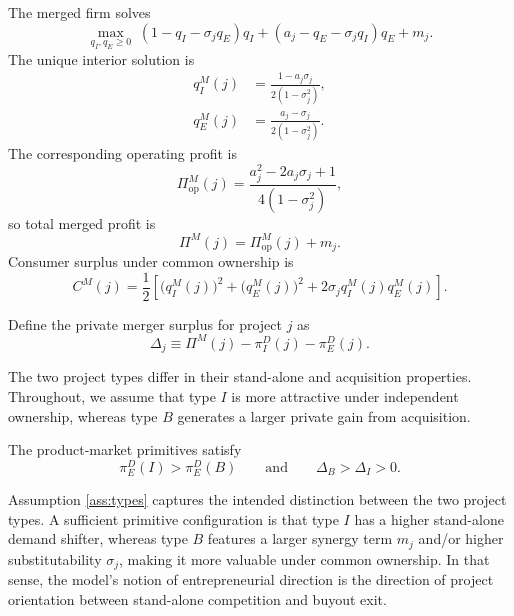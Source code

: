 The merged firm solves
\begin{equation}
    \max_{q_I,q_E \ge 0}\;
    (1-q_I-\sigma_j q_E)q_I
    +
    (a_j-q_E-\sigma_j q_I)q_E
    +
    m_j.
\end{equation}
The unique interior solution is
\begin{align}
    q_I^M(j) &= \frac{1-a_j\sigma_j}{2(1-\sigma_j^2)}, \\
    q_E^M(j) &= \frac{a_j-\sigma_j}{2(1-\sigma_j^2)}.
\end{align}
The corresponding operating profit is
\begin{equation}
    \Pi_{\mathrm{op}}^M(j)
    =
    \frac{a_j^2 - 2a_j\sigma_j + 1}{4(1-\sigma_j^2)},
\end{equation}
so total merged profit is
\begin{equation}
    \Pi^M(j) = \Pi_{\mathrm{op}}^M(j) + m_j.
\end{equation}
Consumer surplus under common ownership is
\begin{equation}\label{eq:csm}
    C^M(j)
    =
    \frac{1}{2}
    \left[
        \bigl(q_I^M(j)\bigr)^2
        + \bigl(q_E^M(j)\bigr)^2
        + 2\sigma_j q_I^M(j)q_E^M(j)
    \right].
\end{equation}

Define the private merger surplus for project \(j\) as
\begin{equation}\label{eq:Deltaj}
    \Delta_j \equiv \Pi^M(j) - \pi_I^D(j) - \pi_E^D(j).
\end{equation}

The two project types differ in their stand-alone and acquisition properties.
Throughout, we assume that type \(I\) is more attractive under independent ownership, whereas type \(B\) generates a larger private gain from acquisition.

\begin{assumption}\label{ass:types}
The product-market primitives satisfy
\begin{equation}
    \pi_E^D(I) > \pi_E^D(B)
    \qquad \text{and} \qquad
    \Delta_B > \Delta_I > 0.
\end{equation}
\end{assumption}

Assumption \ref{ass:types} captures the intended distinction between the two project types.
A sufficient primitive configuration is that type \(I\) has a higher stand-alone demand shifter, whereas type \(B\) features a larger synergy term \(m_j\) and/or higher substitutability \(\sigma_j\), making it more valuable under common ownership.
In that sense, the model's notion of entrepreneurial direction is the direction of project orientation between stand-alone competition and buyout exit.

